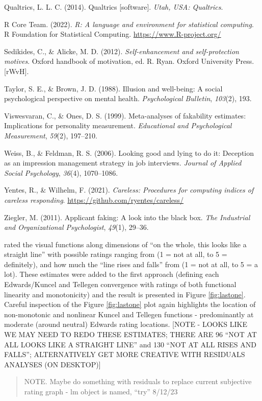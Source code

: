 \documentclass[
  ,jou]{apa6}
\newlength{\cslhangindent}
\newlength{\cslentryspacingunit} %
\newenvironment{CSLReferences}[2] %
 {%
  \setlength{\parindent}{0pt}
  \ifodd #1
  \let\oldpar\par
  \def\par{\hangindent=\cslhangindent\oldpar}
  \fi
  \setlength{\parskip}{#2\cslentryspacingunit}
 }%
 {}
\begin{document}
\begin{CSLReferences}{1}{0}
\leavevmode{}%
Qualtrics, L. L. C. (2014). Qualtrics {[}software{]}. \emph{Utah, {USA}: Qualtrics}.

\leavevmode{}%
R Core Team. (2022). \emph{R: A language and environment for statistical computing}. R Foundation for Statistical Computing. \url{https://www.R-project.org/}

\leavevmode{}%
Sedikides, C., \& Alicke, M. D. (2012). \emph{Self-enhancement and self-protection motives}. Oxford handbook of motivation, ed. R. Ryan. Oxford University Press.{[}{rWvH}{]}.

\leavevmode{}%
Taylor, S. E., \& Brown, J. D. (1988). Illusion and well-being: A social psychological perspective on mental health. \emph{Psychological Bulletin}, \emph{103}(2), 193.

\leavevmode{}%
Viswesvaran, C., \& Ones, D. S. (1999). Meta-analyses of fakability estimates: Implications for personality measurement. \emph{Educational and Psychological Measurement}, \emph{59}(2), 197--210.

\leavevmode{}%
Weiss, B., \& Feldman, R. S. (2006). Looking good and lying to do it: Deception as an impression management strategy in job interviews. \emph{Journal of Applied Social Psychology}, \emph{36}(4), 1070--1086.

\leavevmode{}%
Yentes, R., \& Wilhelm, F. (2021). \emph{Careless: Procedures for computing indices of careless responding}. \url{https://github.com/ryentes/careless/}

\leavevmode{}%
Ziegler, M. (2011). Applicant faking: A look into the black box. \emph{The Industrial and Organizational Psychologist}, \emph{49}(1), 29--36.

\end{CSLReferences}

\endgroup

rated the visual functions along dimensions of ``on the whole, this looks like a straight line'' with possible ratings ranging from (1 = not at all, to 5 = definitely), and how much the ``line rises and falls'' from (1 = not at all, to 5 = a lot). These estimates were added to the first approach (defining each Edwards/Kuncel and Tellegen convergence with ratings of both functional linearity and monotonicity) and the result is presented in Figure \ref{fig:lastone}. Careful inspection of the Figure \ref{fig:lastone} plot again highlights the location of non-monotonic and nonlinear Kuncel and Tellegen functions - predominantly at moderate (around neutral) Edwards rating locations. {[}NOTE - LOOKS LIKE WE MAY NEED TO REDO THESE ESTIMATES; THERE ARE 96 ``NOT AT ALL LOOKS LIKE A STRAIGHT LINE'' and 130 ``NOT AT ALL RISES AND FALLS''; ALTERNATIVELY GET MORE CREATIVE WITH RESIDUALS ANALYSES (ON DESKTOP){]}

\begin{quote}
NOTE. Maybe do something with residuals to replace current subjective rating graph - lm object is named, ``try'' 8/12/23
\end{quote}
\end{document}
